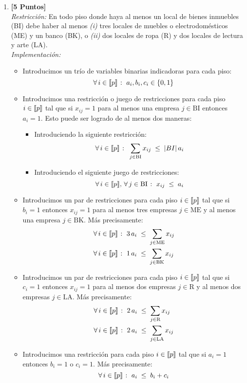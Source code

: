\documentclass[ a4paper, twoside, 11pt]{article}
\begin{document}
\begin{problem}
\begin{enumerate}[label=\textbf{\alph*)}]
\item \textbf{[5 Puntos]} \\[1ex]
\emph{Restricci\'on:} En todo piso donde haya al menos un local de bienes inmuebles (BI) debe haber al menos \textit{(i)} tres locales de muebles o electrodom\'esticos (ME) y un banco (BK), o \textit{(ii)} dos locales de ropa (R) y dos locales de lectura y arte (LA). \\[1ex]
\emph{Implementaci\'on:}
\begin{itemize}
\item Introducimos un tr\'io de variables binarias indicadoras para cada piso: 
\[
\forall \, i \in \llbracket p \rrbracket \; \colon \; a_i, b_i, c_i \in \{ 0, 1 \}
\]
\item Introducimos una restricci\'on o juego de restricciones para cada piso $i \in \llbracket p \rrbracket$ tal que si $x_{ij} = 1$ para al menos una empresa $j \in \text{BI}$ entonces $a_i = 1$. Esto puede ser logrado de al menos dos maneras: 
\begin{itemize}
\item Introduciendo la siguiente restricci\'on: 
\[
\forall \, i \in \llbracket p \rrbracket \; \colon \;
\sum_{j \in \text{BI}} x_{ij} \; \leq \; |BI| \, a_i
\]
\item Introduciendo el siguiente juego de restricciones: 
\[
\forall \, i \in \llbracket p \rrbracket, \, \forall \, j \in \text{BI} \; \colon \;
x_{ij} \; \leq \; a_i
\]
\end{itemize}
\item Introducimos un par de restricciones para cada piso $i \in \llbracket p \rrbracket$ tal que si $b_i = 1$ entonces $x_{ij} = 1$ para al menos tres empresas $j \in \text{ME}$ y al menos una empresa $j \in \text{BK}$. \linebreak M\'as precisamente: 
\begin{align*}
& \forall \, i \in \llbracket p \rrbracket \; \colon \;
3 \, a_i \; \leq \; \sum_{j \in \text{ME}} x_{ij} \\
& \forall \, i \in \llbracket p \rrbracket \; \colon \;
1 \, a_i \; \leq \; \sum_{j \in \text{BK}} x_{ij}
\end{align*}
\item Introducimos un par de restricciones para cada piso $i \in \llbracket p \rrbracket$ tal que si $c_i = 1$ entonces $x_{ij} = 1$ para al menos dos empresas $j \in \text{R}$ y al menos dos empresas $j \in \text{LA}$. \linebreak M\'as precisamente: 
\begin{align*}
& \forall \, i \in \llbracket p \rrbracket \; \colon \;
2 \, a_i \; \leq \; \sum_{j \in \text{R}} x_{ij} \\
& \forall \, i \in \llbracket p \rrbracket \; \colon \;
2 \, a_i \; \leq \; \sum_{j \in \text{LA}} x_{ij}
\end{align*}
\item Introducimos una restricci\'on para cada piso $i \in \llbracket p \rrbracket$ tal que si $a_i = 1$ entonces $b_i = 1$ o $c_i = 1$. M\'as precisamente: 
\[
\forall \, i \in \llbracket p \rrbracket \; \colon \; a_i \; \leq \; b_i + c_i
\]
\end{itemize}


\end{enumerate}
\end{problem}
\end{document}
